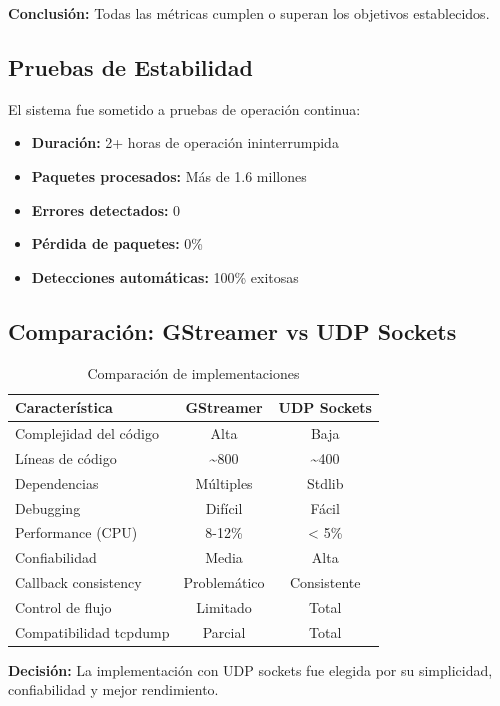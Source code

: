 \documentclass[12pt,a4paper]{article}
\begin{document}
\textbf{Conclusión:} Todas las métricas cumplen o superan los objetivos establecidos.

\subsection{Pruebas de Estabilidad}

El sistema fue sometido a pruebas de operación continua:

\begin{itemize}
    \item \textbf{Duración:} 2+ horas de operación ininterrumpida
    \item \textbf{Paquetes procesados:} Más de 1.6 millones
    \item \textbf{Errores detectados:} 0
    \item \textbf{Pérdida de paquetes:} 0\%
    \item \textbf{Detecciones automáticas:} 100\% exitosas
\end{itemize}

\subsection{Comparación: GStreamer vs UDP Sockets}

\begin{table}[H]
\centering
\caption{Comparación de implementaciones}
\label{tab:comparison}
\begin{tabular}{@{}lcc@{}}
\toprule
\textbf{Característica} & \textbf{GStreamer} & \textbf{UDP Sockets} \\ \midrule
Complejidad del código & Alta & Baja \\
Líneas de código & \textasciitilde800 & \textasciitilde400 \\
Dependencias & Múltiples & Stdlib \\
Debugging & Difícil & Fácil \\
Performance (CPU) & 8-12\% & < 5\% \\
Confiabilidad & Media & Alta \\
Callback consistency & Problemático & Consistente \\
Control de flujo & Limitado & Total \\
Compatibilidad tcpdump & Parcial & Total \\
\bottomrule
\end{tabular}
\end{table}

\textbf{Decisión:} La implementación con UDP sockets fue elegida por su simplicidad, confiabilidad y mejor rendimiento.
\end{document}
